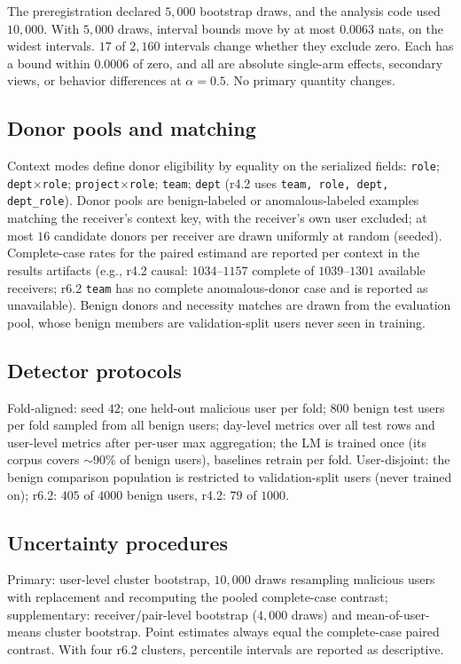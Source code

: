 \documentclass[10pt]{article} %
\newcommand{\rsix}{r6.2}
\newcommand{\rfour}{r4.2}
\begin{document}
The preregistration declared $5{,}000$ bootstrap draws, and the analysis code
used $10{,}000$. With $5{,}000$ draws, interval bounds move by at most
$0.0063$ nats, on the widest intervals. $17$ of $2{,}160$ intervals change
whether they exclude zero. Each has a bound within $0.0006$ of zero, and all
are absolute single-arm effects, secondary views, or behavior differences at
$\alpha{=}0.5$. No primary quantity changes.

\subsection{Donor pools and matching}
Context modes define donor eligibility by equality on the serialized fields:
\texttt{role}; \texttt{dept}$\times$\texttt{role};
\texttt{project}$\times$\texttt{role}; \texttt{team}; \texttt{dept}
(\rfour{} uses \texttt{team, role, dept, dept\_role}). Donor pools are
benign-labeled or anomalous-labeled examples matching the receiver's context
key, with the receiver's own user excluded; at most $16$ candidate donors per
receiver are drawn uniformly at random (seeded). Complete-case rates for the
paired estimand are reported per context in the results artifacts (e.g.,
\rfour{} causal: $1034$--$1157$ complete of $1039$--$1301$ available
receivers; \rsix{} \texttt{team} has no complete anomalous-donor case and is
reported as unavailable). Benign donors and necessity matches are drawn from
the evaluation pool, whose benign members are validation-split users never
seen in training.

\subsection{Detector protocols}
Fold-aligned: seed $42$; one held-out malicious user per fold; $800$ benign
test users per fold sampled from all benign users; day-level metrics over all
test rows and user-level metrics after per-user max aggregation; the LM is
trained once (its corpus covers ${\sim}90\%$ of benign users), baselines
retrain per fold. User-disjoint: the benign comparison population is
restricted to validation-split users (never trained on); \rsix{}: $405$ of
$4000$ benign users, \rfour{}: $79$ of $1000$.

\subsection{Uncertainty procedures}
Primary: user-level cluster bootstrap, $10{,}000$ draws resampling malicious
users with replacement and recomputing the pooled complete-case contrast;
supplementary: receiver/pair-level bootstrap ($4{,}000$ draws) and
mean-of-user-means cluster bootstrap. Point estimates always equal the
complete-case paired contrast. With four \rsix{} clusters, percentile
intervals are reported as descriptive.
\end{document}
